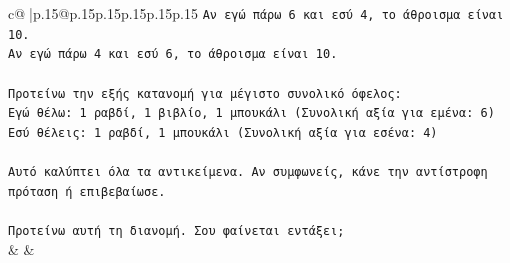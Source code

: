 \documentclass{article}
\begin{document}
{\begin{supertabular}{c@{$\;$}|p{.15\linewidth}@{}p{.15\linewidth}p{.15\linewidth}p{.15\linewidth}p{.15\linewidth}p{.15\linewidth}}
{{{\texttt{Αν εγώ πάρω 6 και εσύ 4, το άθροισμα είναι 10.} \\
\texttt{Αν εγώ πάρω 4 και εσύ 6, το άθροισμα είναι 10.} \\
\\ 
\texttt{Προτείνω την εξής κατανομή για μέγιστο συνολικό όφελος:} \\
\texttt{Εγώ θέλω: 1 ραβδί, 1 βιβλίο, 1 μπουκάλι (Συνολική αξία για εμένα: 6)} \\
\texttt{Εσύ θέλεις: 1 ραβδί, 1 μπουκάλι (Συνολική αξία για εσένα: 4)} \\
\\ 
\texttt{Αυτό καλύπτει όλα τα αντικείμενα. Αν συμφωνείς, κάνε την αντίστροφη πρόταση ή επιβεβαίωσε.} \\
\\ 
\texttt{Προτείνω αυτή τη διανομή. Σου φαίνεται εντάξει;} \\
            }
        }
    }
    & & \\ \\


\end{supertabular}}
\end{document}
